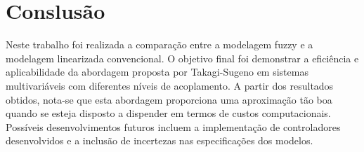 %

\chapter{Conslusão}
\label{capConclusao}
Neste trabalho foi realizada a comparação entre a modelagem fuzzy e a modelagem linearizada convencional. O objetivo final foi demonstrar a eficiência e aplicabilidade da abordagem proposta por Takagi-Sugeno em sistemas multivariáveis com diferentes níveis de acoplamento. A partir dos resultados obtidos, nota-se que esta abordagem proporciona uma aproximação tão boa quando se esteja disposto a dispender em termos de custos computacionais. 
Possíveis desenvolvimentos futuros incluem a implementação de controladores desenvolvidos e a inclusão de incertezas nas especificações dos modelos.

%

